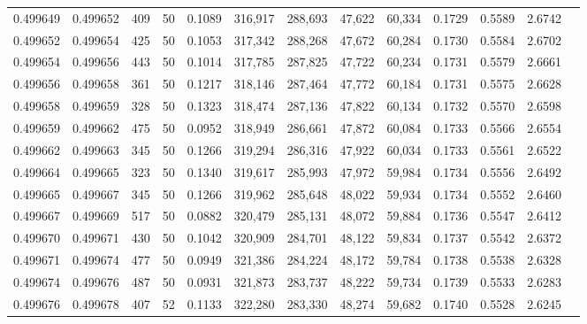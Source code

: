 \begin{tabular}{rrrrrrrrrrrrr}
0.499649 & 0.499652 & 409 &  50 &                                     0.1089 & 316,917 & 288,693 &  47,622 &  60,334 & 0.1729 & 0.5589 & 2.6742 \\
0.499652 & 0.499654 & 425 &  50 &                                     0.1053 & 317,342 & 288,268 &  47,672 &  60,284 & 0.1730 & 0.5584 & 2.6702 \\
0.499654 & 0.499656 & 443 &  50 &                                     0.1014 & 317,785 & 287,825 &  47,722 &  60,234 & 0.1731 & 0.5579 & 2.6661 \\
0.499656 & 0.499658 & 361 &  50 &                                     0.1217 & 318,146 & 287,464 &  47,772 &  60,184 & 0.1731 & 0.5575 & 2.6628 \\
0.499658 & 0.499659 & 328 &  50 &                                     0.1323 & 318,474 & 287,136 &  47,822 &  60,134 & 0.1732 & 0.5570 & 2.6598 \\
0.499659 & 0.499662 & 475 &  50 &                                     0.0952 & 318,949 & 286,661 &  47,872 &  60,084 & 0.1733 & 0.5566 & 2.6554 \\
0.499662 & 0.499663 & 345 &  50 &                                     0.1266 & 319,294 & 286,316 &  47,922 &  60,034 & 0.1733 & 0.5561 & 2.6522 \\
0.499664 & 0.499665 & 323 &  50 &                                     0.1340 & 319,617 & 285,993 &  47,972 &  59,984 & 0.1734 & 0.5556 & 2.6492 \\
0.499665 & 0.499667 & 345 &  50 &                                     0.1266 & 319,962 & 285,648 &  48,022 &  59,934 & 0.1734 & 0.5552 & 2.6460 \\
0.499667 & 0.499669 & 517 &  50 &                                     0.0882 & 320,479 & 285,131 &  48,072 &  59,884 & 0.1736 & 0.5547 & 2.6412 \\
0.499670 & 0.499671 & 430 &  50 &                                     0.1042 & 320,909 & 284,701 &  48,122 &  59,834 & 0.1737 & 0.5542 & 2.6372 \\
0.499671 & 0.499674 & 477 &  50 &                                     0.0949 & 321,386 & 284,224 &  48,172 &  59,784 & 0.1738 & 0.5538 & 2.6328 \\
0.499674 & 0.499676 & 487 &  50 &                                     0.0931 & 321,873 & 283,737 &  48,222 &  59,734 & 0.1739 & 0.5533 & 2.6283 \\
0.499676 & 0.499678 & 407 &  52 &                                     0.1133 & 322,280 & 283,330 &  48,274 &  59,682 & 0.1740 & 0.5528 & 2.6245 \\

\end{tabular}
